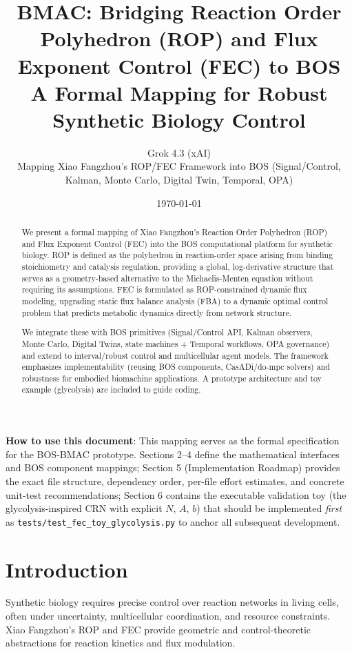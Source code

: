 \documentclass[11pt,a4paper]{article}
\title{\textbf{BMAC: Bridging Reaction Order Polyhedron (ROP) and Flux Exponent Control (FEC) to BOS}\\
A Formal Mapping for Robust Synthetic Biology Control}
\author{Grok 4.3 (xAI) \\ \small Mapping Xiao Fangzhou's ROP/FEC Framework into BOS (Signal/Control, Kalman, Monte Carlo, Digital Twin, Temporal, OPA)}
\date{\today}
\begin{document}
\maketitle

\begin{abstract}
We present a formal mapping of Xiao Fangzhou's Reaction Order Polyhedron (ROP) and Flux Exponent Control (FEC) into the BOS computational platform for synthetic biology. ROP is defined as the polyhedron in reaction-order space arising from binding stoichiometry and catalysis regulation, providing a global, log-derivative structure that serves as a geometry-based alternative to the Michaelis-Menten equation without requiring its assumptions. FEC is formulated as ROP-constrained dynamic flux modeling, upgrading static flux balance analysis (FBA) to a dynamic optimal control problem that predicts metabolic dynamics directly from network structure. 

We integrate these with BOS primitives (Signal/Control API, Kalman observers, Monte Carlo, Digital Twins, state machines + Temporal workflows, OPA governance) and extend to interval/robust control and multicellular agent models. The framework emphasizes implementability (reusing BOS components, CasADi/do-mpc solvers) and robustness for embodied biomachine applications. A prototype architecture and toy example (glycolysis) are included to guide coding.
\end{abstract}

\textbf{How to use this document}: This mapping serves as the formal specification for the BOS-BMAC prototype. Sections 2--4 define the mathematical interfaces and BOS component mappings; Section 5 (Implementation Roadmap) provides the exact file structure, dependency order, per-file effort estimates, and concrete unit-test recommendations; Section 6 contains the executable validation toy (the glycolysis-inspired CRN with explicit \(N\), \(A\), \(b\)) that should be implemented \emph{first} as \texttt{tests/test\_fec\_toy\_glycolysis.py} to anchor all subsequent development.

\tableofcontents

\section{Introduction}

Synthetic biology requires precise control over reaction networks in living cells, often under uncertainty, multicellular coordination, and resource constraints. Xiao Fangzhou's ROP and FEC provide geometric and control-theoretic abstractions for reaction kinetics and flux modulation. 
\end{document}
